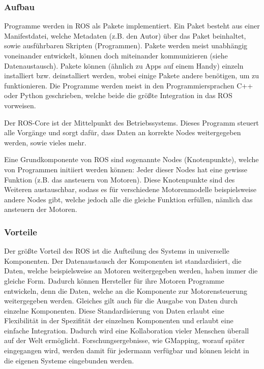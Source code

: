 {{{		}
		
		\subsubsection{Aufbau}
		{ 
			Programme werden in ROS als Pakete implementiert. Ein Paket besteht aus einer Manifestdatei, welche Metadaten (z.B. den Autor) über das Paket beinhaltet, sowie ausführbaren Skripten (Programmen). Pakete werden meist unabhängig voneinander entwickelt, können doch miteinander kommunizieren (siehe Datenaustausch). Pakete können (ähnlich zu Apps auf einem Handy) einzeln installiert bzw. deinstalliert werden, wobei einige Pakete andere benötigen, um zu funktionieren. Die Programme werden meist in den Programmiersprachen C++ oder Python geschrieben, welche beide die größte Integration in das ROS vorweisen.
			
			Der ROS-Core ist der Mittelpunkt des Betriebssystems. Dieses Programm steuert alle Vorgänge und sorgt dafür, dass Daten an korrekte Nodes weitergegeben werden, sowie vieles mehr. 
			
			Eine Grundkomponente von ROS sind sogenannte Nodes (Knotenpunkte), welche von Programmen initiiert werden können: Jeder dieser Nodes hat eine gewisse Funktion (z.B. das ansteuern von Motoren). Diese Knotenpunkte sind des Weiteren austauschbar, sodass es für verschiedene Motorenmodelle beispielsweise andere Nodes gibt, welche jedoch alle die gleiche Funktion erfüllen, nämlich das ansteuern der Motoren.
		}
	
		\subsubsection{Vorteile}
		{
			Der größte Vorteil des ROS ist die Aufteilung des Systems in universelle Komponenten. Der Datenaustausch der Komponenten ist standardisiert, \dahe die Daten, welche beispielsweise an Motoren weitergegeben werden, haben immer die gleiche Form. Dadurch können Hersteller für ihre Motoren Programme entwickeln, denn die Daten, welche an die Komponente zur Motorensteuerung weitergegeben werden. Gleiches gilt auch für die Ausgabe von Daten durch einzelne Komponenten. Diese Standardisierung von Daten erlaubt eine Flexibilität in der Spezifität der einzelnen Komponenten und erlaubt eine einfache Integration. Dadurch wird eine Kollaboration vieler Menschen überall auf der Welt ermöglicht. Forschungsergebnisse, wie \zb GMapping, worauf später eingegangen wird, werden damit für jedermann verfügbar und können leicht in die eigenen Systeme eingebunden werden.
		}
		
}}
